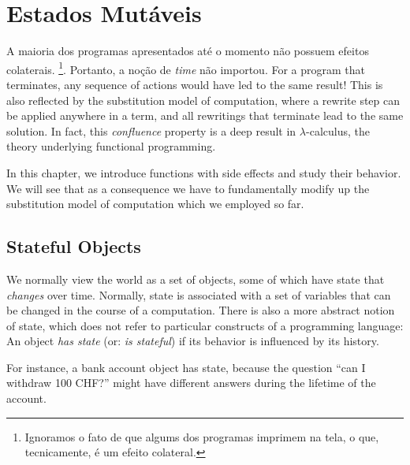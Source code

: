 \chapter{Estados Mutáveis}

A maioria dos programas apresentados até o momento não possuem efeitos colaterais.
\footnote{Ignoramos o fato de que algums dos programas imprimem na tela, o que, 
tecnicamente, é um efeito colateral.}.  Portanto, a noção de {\em time} não
importou.  
For a program that terminates,
any sequence of actions would have led to the same result!  This is
also reflected by the substitution model of computation, where a
rewrite step can be applied anywhere in a term, and all rewritings
that terminate lead to the same solution.  In fact, this {\em
confluence} property is a deep result in $\lambda$-calculus, the
theory underlying functional programming. 

In this chapter, we introduce functions with side effects and study
their behavior. We will see that as a consequence we have to
fundamentally modify up the substitution model of computation which we
employed so far.

\section{Stateful Objects}

We normally view the world as a set of objects, some of which have
state that {\em changes} over time.  Normally, state is associated
with a set of variables that can be changed in the course of a
computation.  There is also a more abstract notion of state, which
does not refer to particular constructs of a programming language: An
object {\em has state} (or: {\em is stateful}) if its behavior is
influenced by its history.

For instance, a bank account object has state, because the question
``can I withdraw 100 CHF?''
might have different answers during the lifetime of the account.

